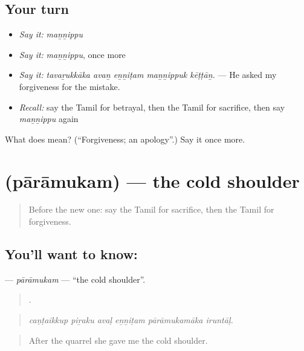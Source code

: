 \subsection*{Your turn}
\begin{itemize}
\raggedright
  \item \emph{Say it:} \emph{maṉṉippu}
  \item \emph{Say it:} \emph{maṉṉippu}, once more
  \item \emph{Say it:} \emph{tavaṟukkāka avaṉ eṉṉiṭam maṉṉippuk kēṭṭāṉ.} — He asked my forgiveness for the mistake.
  \item \emph{Recall:} say the Tamil for betrayal, then the Tamil for sacrifice, then say \emph{maṉṉippu} again
\end{itemize}

\begin{tcolorbox}[breakable,colback=teal!4,colframe=teal!35!black,title={Before you move on}]
What does  mean? (\textquotedblleft{}Forgiveness; an apology\textquotedblright{}.) Say it once more.
\end{tcolorbox}
\section[\texorpdfstring{\ta{பாராமுகம்} (pārāmukam)}{பாராமுகம் (pārāmukam)}]{ (pārāmukam) — the cold shoulder}

\label{lesson:TA-C470-paramukam}



\begin{quote}
Before the new one: say the Tamil for sacrifice, then the Tamil for forgiveness.
\end{quote}

\subsection*{You'll want to know: }
\textbf{} — \emph{pārāmukam} — \textquotedblleft{}the cold shoulder\textquotedblright{}.

\begin{quote}
     .
\end{quote}

\begin{quote}
\emph{caṇṭaikkup piṟaku avaḷ eṉṉiṭam pārāmukamāka iruntāḷ.}
\end{quote}

\begin{quote}
After the quarrel she gave me the cold shoulder.
\end{quote}

